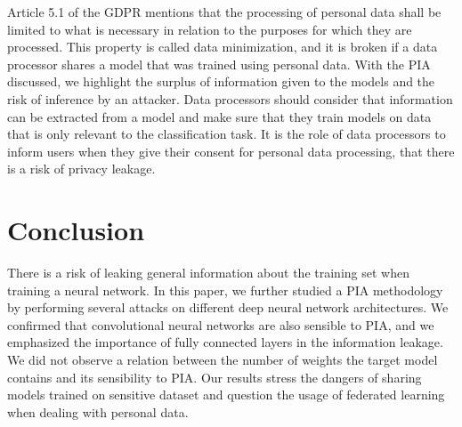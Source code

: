 \documentclass[11pt]{article}
\begin{document}
Article 5.1 of the GDPR mentions that the processing of personal data shall be limited to what is necessary in relation to the purposes for which they are processed. This property is called data minimization, and it is broken if a data processor shares a model that was trained using personal data. With the PIA discussed, we highlight the surplus of information given to the models and the risk of inference by an attacker. Data processors should consider that information can be extracted from a model and make sure that they train models on data that is only relevant to the classification task. It is the role of data processors to inform users when they give their consent for personal data processing, that there is a risk of privacy leakage.\\

\section{Conclusion}
There is a  risk of leaking general information about the training set when training a neural network. 
In this paper, we further studied a PIA methodology by performing several attacks on different deep neural network architectures. We confirmed that convolutional neural networks are also sensible to PIA, and we emphasized the importance of fully connected layers in the information leakage. We did not observe a relation between the number of weights the target model contains and its sensibility to PIA. Our results stress the dangers of sharing models trained on sensitive dataset and question the usage of federated learning when dealing with personal data.\\

%
%


\end{document}
